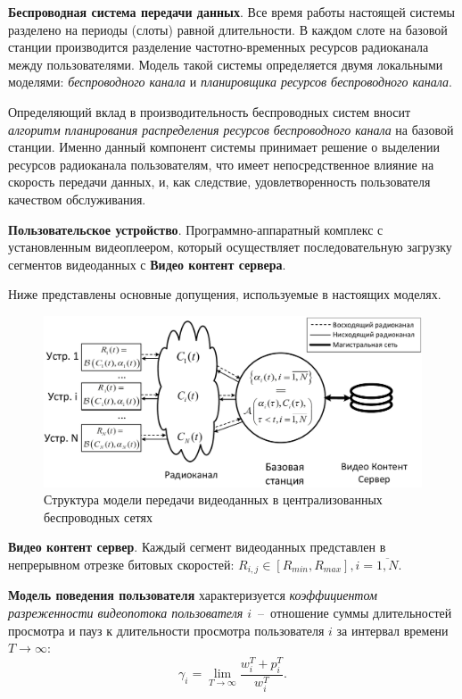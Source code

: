 \textbf{Беспроводная система передачи данных}. Все время работы настоящей системы разделено на периоды (слоты) равной длительности. В каждом слоте на базовой станции производится разделение частотно-временных ресурсов радиоканала между пользователями. Модель такой системы определяется двумя локальными моделями: \textit{беспроводного канала} и \textit{планировщика ресурсов беспроводного канала}.

Определяющий вклад в производительность беспроводных систем вносит \textit{алгоритм планирования распределения ресурсов беспроводного канала} на базовой станции. Именно данный компонент системы принимает решение о выделении ресурсов радиоканала пользователям, что имеет непосредственное влияние на скорость передачи данных, и, как следствие, удовлетворенность пользователя качеством обслуживания.

\textbf{Пользовательское устройство}. Программно-аппаратный комплекс с установленным видеоплеером, который осуществляет последовательную загрузку сегментов видеоданных с \textbf{Видео контент сервера}.

Ниже представлены основные допущения, используемые в настоящих моделях.

\begin{figure}[htbp]
\begin{center}
\includegraphics[width=\textwidth]{../Dissertation/images/Chapter2/SystemModelEch.pdf}
\caption{Структура модели передачи видеоданных в централизованных беспроводных сетях}
\label{fig:SystemModel}
\end{center}
\end{figure}

\textbf{Видео контент сервер}. Каждый сегмент видеоданных представлен в непрерывном отрезке битовых скоростей: $R_{i,j} \in [R_{min}, R_{max}], i=\overline{1,N}$.

\textbf{Модель поведения пользователя} характеризуется \textit{коэффициентом разреженности видеопотока пользователя $i$}~--~отношение суммы длительностей просмотра и пауз к длительности просмотра пользователя $i$ за интервал времени $T\rightarrow\infty$:
$$\gamma_i = \lim\limits_{T\rightarrow\infty} \frac{w_i^T + p_i^T}{w_i^T}.$$

